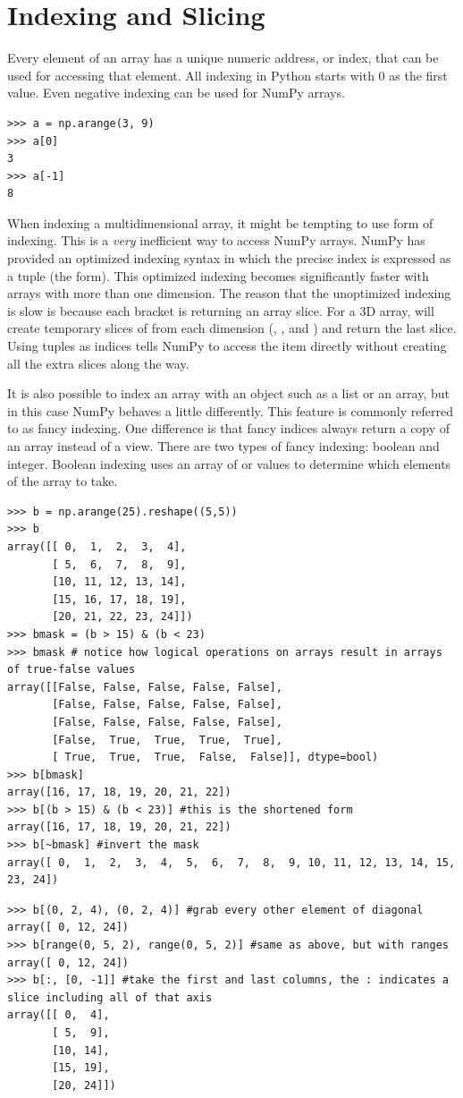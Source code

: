 \section*{Indexing and Slicing}
Every element of an array has a unique numeric address, or index, that can be used for accessing that element.
All indexing in Python starts with 0 as the first value.
Even negative indexing can be used for NumPy arrays.
\begin{lstlisting}
>>> a = np.arange(3, 9)
>>> a[0]
3
>>> a[-1]
8
\end{lstlisting}
When indexing a multidimensional array, it might be tempting to use  form of indexing.
This is a \emph{very} inefficient way to access NumPy arrays.
NumPy has provided an optimized indexing syntax in which the precise index is expressed as a tuple (the  form).  This optimized indexing becomes significantly faster with arrays with more than one dimension.
The reason that the unoptimized indexing is slow is because each bracket is returning an array slice.  
For a 3D array,  will create temporary slices of  from each dimension (, , and ) and return the last slice.
Using tuples as indices tells NumPy to access the item directly without creating all the extra slices along the way.

It is also possible to index an array with an object such as a list or an array, but in this case NumPy behaves a little differently.
This feature is commonly referred to as fancy indexing.
One difference is that fancy indices always return a copy of an array instead of a view.
There are two types of fancy indexing: boolean and integer.
Boolean indexing uses an array of  or  values to determine which elements of the array to take.
\begin{lstlisting}
>>> b = np.arange(25).reshape((5,5))
>>> b
array([[ 0,  1,  2,  3,  4],
       [ 5,  6,  7,  8,  9],
       [10, 11, 12, 13, 14],
       [15, 16, 17, 18, 19],
       [20, 21, 22, 23, 24]])
>>> bmask = (b > 15) & (b < 23)
>>> bmask # notice how logical operations on arrays result in arrays of true-false values
array([[False, False, False, False, False],
       [False, False, False, False, False],
       [False, False, False, False, False],
       [False,  True,  True,  True,  True],
       [ True,  True,  True,  False,  False]], dtype=bool)
>>> b[bmask]
array([16, 17, 18, 19, 20, 21, 22])
>>> b[(b > 15) & (b < 23)] #this is the shortened form
array([16, 17, 18, 19, 20, 21, 22])
>>> b[~bmask] #invert the mask
array([ 0,  1,  2,  3,  4,  5,  6,  7,  8,  9, 10, 11, 12, 13, 14, 15, 23, 24])
\end{lstlisting}
\begin{lstlisting}
>>> b[(0, 2, 4), (0, 2, 4)] #grab every other element of diagonal
array([ 0, 12, 24])
>>> b[range(0, 5, 2), range(0, 5, 2)] #same as above, but with ranges
array([ 0, 12, 24])
>>> b[:, [0, -1]] #take the first and last columns, the : indicates a slice including all of that axis
array([[ 0,  4],
       [ 5,  9],
       [10, 14],
       [15, 19],
       [20, 24]])
\end{lstlisting}

